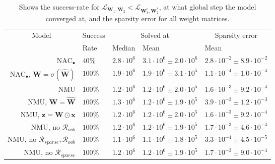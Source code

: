 \begin{table}[H]

\caption{\label{tab:function-task-static-ablation}Shows the success-rate for $\mathcal{L}_{\mathbf{W}_1, \mathbf{W}_2} < \mathcal{L}_{\mathbf{W}_1^\epsilon, \mathbf{W}_2^*}$, at what global step the model converged at, and the sparsity error for all weight matrices.}
\centering
\begin{tabular}{rllll}
\toprule
\multicolumn{1}{c}{Model} & \multicolumn{1}{c}{Success} & \multicolumn{2}{c}{Solved at} & \multicolumn{1}{c}{Sparsity error} \\
\cmidrule(l{3pt}r{3pt}){1-1} \cmidrule(l{3pt}r{3pt}){2-2} \cmidrule(l{3pt}r{3pt}){3-4} \cmidrule(l{3pt}r{3pt}){5-5}
 & Rate & Median & Mean & Mean\\
\midrule
$\mathrm{NAC}_{\bullet}$ & $40\%$ & $2.8 \cdot 10^{6}$ & $3.1 \cdot 10^{6} \pm 2.0 \cdot 10^{6}$ & $2.8 \cdot 10^{-2} \pm 8.9 \cdot 10^{-2}$\\

$\mathrm{NAC}_{\bullet}$, $\mathbf{W} = \sigma(\mathbf{\hat{W}})$ & $100\%$ & $1.9 \cdot 10^{6}$ & $1.9 \cdot 10^{6} \pm 3.1 \cdot 10^{5}$ & $1.1 \cdot 10^{-4} \pm 1.0 \cdot 10^{-4}$\\

NMU & $100\%$ & $1.2 \cdot 10^{6}$ & $1.2 \cdot 10^{6} \pm 2.0 \cdot 10^{5}$ & $1.6 \cdot 10^{-3} \pm 9.2 \cdot 10^{-4}$\\

NMU, $\mathbf{W} = \mathbf{\hat{W}}$ & $100\%$ & $1.3 \cdot 10^{6}$ & $1.2 \cdot 10^{6} \pm 1.9 \cdot 10^{5}$ & $3.9 \cdot 10^{-3} \pm 1.2 \cdot 10^{-3}$\\

NMU, $\mathbf{z} = \mathbf{W} \odot \mathbf{x}$ & $100\%$ & $1.2 \cdot 10^{6}$ & $1.2 \cdot 10^{6} \pm 2.0 \cdot 10^{5}$ & $1.6 \cdot 10^{-3} \pm 9.2 \cdot 10^{-4}$\\

NMU, no $\mathcal{R}_{oob}$ & $100\%$ & $1.2 \cdot 10^{6}$ & $1.2 \cdot 10^{6} \pm 1.9 \cdot 10^{5}$ & $1.7 \cdot 10^{-3} \pm 4.6 \cdot 10^{-4}$\\

NMU, no $\mathcal{R}_{sparse},\mathcal{R}_{oob}$ & $100\%$ & $1.1 \cdot 10^{6}$ & $1.1 \cdot 10^{6} \pm 1.8 \cdot 10^{5}$ & $3.3 \cdot 10^{-4} \pm 4.5 \cdot 10^{-5}$\\

NMU, no $\mathcal{R}_{sparse}$ & $100\%$ & $1.2 \cdot 10^{6}$ & $1.2 \cdot 10^{6} \pm 1.9 \cdot 10^{5}$ & $1.7 \cdot 10^{-3} \pm 9.0 \cdot 10^{-4}$\\
\bottomrule
\end{tabular}
\end{table}
